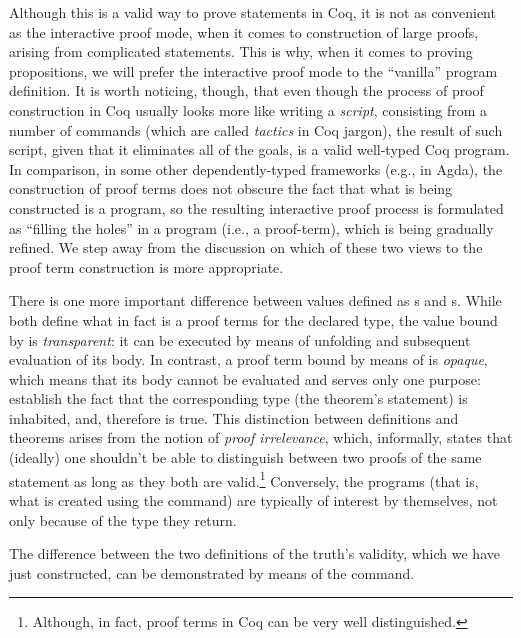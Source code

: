 Although this is a valid way to prove statements in Coq, it is not as
convenient as the interactive proof mode, when it comes to
construction of large proofs, arising from complicated
statements. This is why, when it comes to proving propositions, we
will prefer the interactive proof mode to the ``vanilla'' program
definition. It is worth noticing, though, that even though the process
of proof construction in Coq usually looks more like writing a
\textit{script}, consisting from a number of commands (which are called
\textit{tactics} in Coq jargon),  the result of such script, given that it eliminates all of
the goals, is a valid well-typed Coq program. In comparison, in some
other dependently-typed frameworks (e.g., in Agda), the
construction of proof terms does not obscure the fact that what is
being constructed is a program, so the resulting interactive proof
process is formulated as ``filling the holes'' in a program (i.e., a
proof-term), which is being gradually refined. We step away from the
discussion on which of these two views to the proof term construction
is more appropriate.


There is one more important difference between values defined as
s  and s. While
both define what in fact is a proof terms for the declared type, the
value bound by  is \textit{transparent}: it can be executed by
means of unfolding and subsequent evaluation of its body. In contrast,
a proof term bound by means of  is \textit{opaque}, which means that
its body cannot be evaluated and serves only one purpose: establish
the fact that the corresponding type (the theorem's statement) is
inhabited, and, therefore is true.  This distinction between
definitions and theorems arises from the notion of \textit{proof
irrelevance}, which, informally, states that (ideally) one shouldn't
be able to distinguish between two proofs of the same statement as
long as they both are valid.\footnote{Although, in fact, proof terms
in Coq can be very well distinguished.} Conversely, the programs
(that is, what is created using the  command) are
typically of interest by themselves, not only because of the type they
return.


The difference between the two definitions of the truth's validity,
which we have just constructed, can be demonstrated by means of the
 command.


